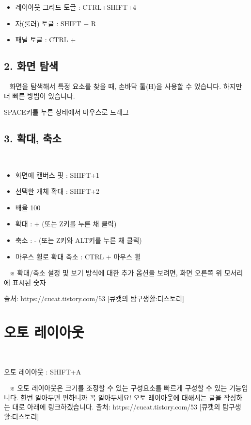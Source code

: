 \documentclass[12pt, a4paper, oneside]{book}
\begin{document}
			\begin{itemize}[topsep=0.0em, parsep=0.0em, itemsep=0em, leftmargin=6.0em, labelwidth=3em, labelsep=1em] 
			\item 	레이아웃 그리드 토글 : CTRL+SHIFT+4
			\item 	자(룰러) 토글 : SHIFT + R
			\item 	패널 토글 : CTRL + \
			\end{itemize}



	\subsection{2. 화면 탐색}
 
화면을 탐색해서 특정 요소를 찾을 때, 손바닥 툴(H)을 사용할 수 있습니다. 하지만 더 빠른 방법이 있습니다.
 

SPACE키를 누른 상태에서 마우스로 드래그


	\subsection{3. 확대, 축소}
 
			\begin{itemize}[topsep=0.0em, parsep=0.0em, itemsep=0em, leftmargin=6.0em, labelwidth=3em, labelsep=1em] 
			\item 	화면에 캔버스 핏 : SHIFT+1
			\item 	선택한 개체 확대 : SHIFT+2
			\item 	배율 100%
			\item 	확대 : + (또는 Z키를 누른 채 클릭)
			\item 	축소 : - (또는 Z키와 ALT키를 누른 채 클릭)
			\item 	마우스 휠로 확대 축소 : CTRL + 마우스 휠
			\end{itemize}


 
※ 확대/축소 설정 및 보기 방식에 대한 추가 옵션을 보려면, 화면 오른쪽 위 모서리에 표시된 숫자%

출처: https://cucat.tistory.com/53 [큐캣의 탐구생활:티스토리]


	\section{오토 레이아웃}
 

오토 레이아웃 : SHIFT+A

 
※ 오토 레이아웃은 크기를 조정할 수 있는 구성요소를 빠르게 구성할 수 있는 기능입니다. 한번 알아두면 편하니까 꼭 알아두세요! 오토 레이아웃에 대해서는 글을 작성하는 대로 아래에 링크하겠습니다.
출처: https://cucat.tistory.com/53 [큐캣의 탐구생활:티스토리]
\end{document}
